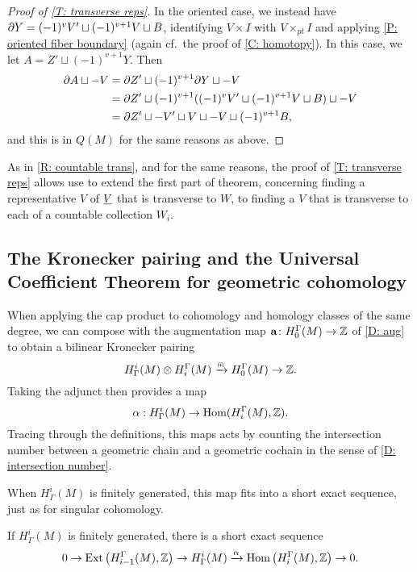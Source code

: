 \begin{proof}[Proof of \cref{T: transverse reps}]
	In the oriented case, we instead have $\partial Y = (-1)^{v} V' \sqcup (-1)^{v+1} V \sqcup B$, identifying $V \times I$ with $V \times_{pt} I$ and applying \cref{P: oriented fiber boundary} (again cf.\ the proof of \cref{C: homotopy}).
	In this case, we let $A = Z' \sqcup (-1)^{v+1} Y$.
	Then
	\begin{align*}
		\partial A \sqcup -V &= \partial Z' \sqcup (-1)^{v+1}\partial Y \sqcup -V\\
		&= \partial Z' \sqcup (-1)^{v+1}((-1)^{v} V' \sqcup (-1)^{v+1} V \sqcup B) \sqcup -V\\
		&= \partial Z' \sqcup -V' \sqcup V \sqcup -V \sqcup (-1)^{v+1}B,
	\end{align*}
	and this is in $Q(M)$ for the same reasons as above.
\end{proof}


\begin{remark}\label{R: countable trans2}
As in \cref{R: countable trans}, and for the same reasons, the proof of \cref{T: transverse reps} allows use to extend the first part of theorem, concerning finding a representative $V$ of $\underline{V}$ that is transverse to $W$, to finding a $V$ that is transverse to each of a countable collection $W_i$.
\end{remark}




\subsection{The Kronecker pairing and the Universal Coefficient Theorem for geometric cohomology}

When applying the cap product to cohomology and homology classes of the same degree, we can compose with the augmentation map $\mathbf{a} \colon H_0^\Gamma(M) \to \mathbb{Z}$ of \cref{D: aug} to obtain a bilinear Kronecker pairing
$$H^i_\Gamma(M) \otimes H_i^\Gamma(M) \xrightarrow{\nplus} H_0^\Gamma(M) \to \mathbb{Z}.$$
Taking the adjunct then provides a map
$$\alpha: H^i_\Gamma(M) \to \textup{Hom}(H_i^\Gamma(M),\mathbb{Z}).$$
Tracing through the definitions, this maps acts by counting the intersection number between a geometric chain and a geometric cochain in the sense of \cref{D: intersection number}.

When $H^i_\Gamma(M)$ is finitely generated, this map fits into a short exact sequence, just as for singular cohomology.

\begin{theorem}\label{T: UCT}
	If $H^i_\Gamma(M)$ is finitely generated, there is a short exact sequence
	\[
	0 \to \text{Ext}\left(H_{i-1}^\Gamma(M),\mathbb{Z}\right) \to H^i_\Gamma(M) \xrightarrow{\alpha} \textup{Hom}\left(H_i^\Gamma(M),\mathbb{Z}\right) \to 0.
	\]
\end{theorem}

